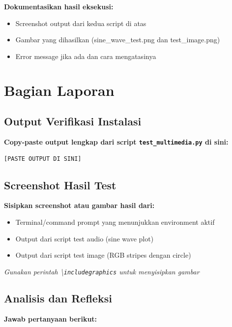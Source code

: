 \documentclass[11pt,a4paper]{article}
\begin{document}
\textbf{Dokumentasikan hasil eksekusi:}
\begin{itemize}
    \item Screenshot output dari kedua script di atas
    \item Gambar yang dihasilkan (sine\_wave\_test.png dan test\_image.png)
    \item Error message jika ada dan cara mengatasinya
\end{itemize}

\section{Bagian Laporan}

\subsection{Output Verifikasi Instalasi}
\textbf{Copy-paste output lengkap dari script \texttt{test\_multimedia.py} di sini:}

\begin{lstlisting}[caption=Output verifikasi instalasi]
[PASTE OUTPUT DI SINI]
\end{lstlisting}

\subsection{Screenshot Hasil Test}
\textbf{Sisipkan screenshot atau gambar hasil dari:}
\begin{itemize}
    \item Terminal/command prompt yang menunjukkan environment aktif
    \item Output dari script test audio (sine wave plot)
    \item Output dari script test image (RGB stripes dengan circle)
\end{itemize}

\textit{Gunakan perintah \textbackslash\texttt{includegraphics} untuk menyisipkan gambar}

\subsection{Analisis dan Refleksi}
\textbf{Jawab pertanyaan berikut:}
\end{document}
